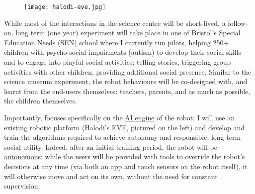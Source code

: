 \begin{figure}
    \centering
    \vspace{-10pt}
    \texttt{[image: halodi-eve.jpg]}
    \label{fig|EVE}
\end{figure}

While most of the interactions in the science centre will be short-lived, a
follow-on, long term (one year) experiment will take place in one of Bristol's
Special Education Needs (SEN) school where I currently run pilots, helping 250+
children with psycho-social impairments (autism) to develop their social skills
and to engage into playful social activities: telling stories, triggering group
activities with other children, providing additional social presence. Similar to
the science museum experiment, the robot behaviours will be co-designed with,
and learnt from the end-users themselves: teachers, parents, and as much as possible,
the children themselves.


Importantly, \project focuses specifically on the \ul{AI engine} of the robot: I
will use an existing robotic platform (Halodi's EVE, pictured on the left) and
develop and train the algorithms required to achieve autonomy and responsible,
long-term social utility. Indeed, after an initial training period, the robot
will be \ul{autonomous}: while the users will be provided with tools to override
the robot's decisions at any time (via both an app and touch sensors on the robot
itself), it will otherwise move and act on its own, without the need for
constant supervision.





